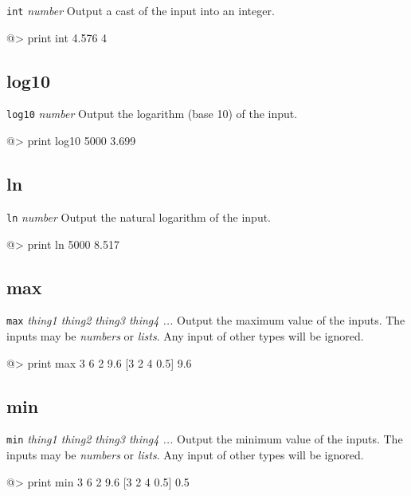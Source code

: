 {\tt int} {\it number} 
\newline\newline 
Output a cast of the input into an integer. 
\begin{verbatimtab} 
@> print int 4.576 
4 
\end{verbatimtab}
 
\subsection*{log10}  
 
{\tt log10} {\it number} 
\newline\newline 
Output the logarithm (base 10) of the input. 
\begin{verbatimtab} 
@> print log10 5000 
3.699 
\end{verbatimtab}
 
\subsection*{ln}  
 
{\tt ln} {\it number} 
\newline\newline 
Output the natural logarithm of the input. 
\begin{verbatimtab} 
@> print ln 5000 
8.517 
\end{verbatimtab}
 
 
\subsection*{max}  
 
{\tt max} {\it thing1 thing2 thing3 thing4 ...} 
\newline\newline 
Output the maximum value of the inputs.  The inputs may be {\it numbers} or {\it lists}. Any input of other types 
will be ignored. 
\begin{verbatimtab} 
@> print max 3 6 2 9.6 [3 2 4 0.5] 
9.6 
\end{verbatimtab} 
 
\subsection*{min}  
 
{\tt min} {\it thing1 thing2 thing3 thing4 ...} 
\newline\newline 
Output the minimum value of the inputs.  The inputs may be {\it numbers} or {\it lists}. Any input of other types 
will be ignored. 
\begin{verbatimtab} 
@> print min 3 6 2 9.6 [3 2 4 0.5] 
0.5 
\end{verbatimtab}
 

